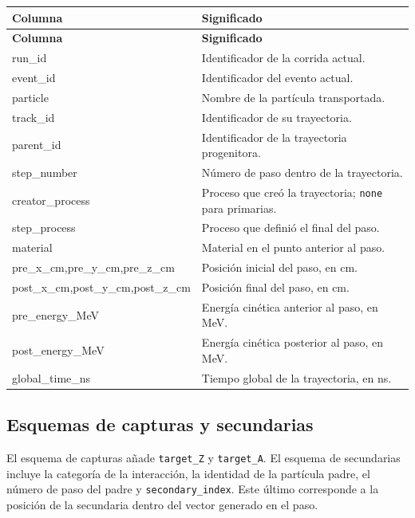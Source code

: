 \documentclass[11pt,a4paper]{article}
\newcommand{\codigo}[1]{\nolinkurl{#1}}
\begin{document}
\small
\begin{longtable}{>{\ttfamily}p{}p{}}
\toprule
\normalfont\textbf{Columna} & \textbf{Significado}\\
\midrule
\endfirsthead
\toprule
\normalfont\textbf{Columna} & \textbf{Significado}\\
\midrule
\endhead
run\_id & Identificador de la corrida actual.\\
event\_id & Identificador del evento actual.\\
particle & Nombre de la partícula transportada.\\
track\_id & Identificador de su trayectoria.\\
parent\_id & Identificador de la trayectoria progenitora.\\
step\_number & Número de paso dentro de la trayectoria.\\
creator\_process & Proceso que creó la trayectoria; \codigo{none} para primarias.\\
step\_process & Proceso que definió el final del paso.\\
material & Material en el punto anterior al paso.\\
pre\_x\_cm,\newline pre\_y\_cm,\newline pre\_z\_cm & Posición inicial del paso, en cm.\\
post\_x\_cm,\newline post\_y\_cm,\newline post\_z\_cm & Posición final del paso, en cm.\\
pre\_energy\_MeV & Energía cinética anterior al paso, en MeV.\\
post\_energy\_MeV & Energía cinética posterior al paso, en MeV.\\
global\_time\_ns & Tiempo global de la trayectoria, en ns.\\
\bottomrule
\end{longtable}
\normalsize

\subsection{Esquemas de capturas y secundarias}

El esquema de capturas añade \codigo{target_Z} y \codigo{target_A}. El esquema
de secundarias incluye la categoría de la interacción, la identidad de la
partícula padre, el número de paso del padre y
\codigo{secondary_index}. Este último corresponde a la posición de la
secundaria dentro del vector generado en el paso.
\end{document}
